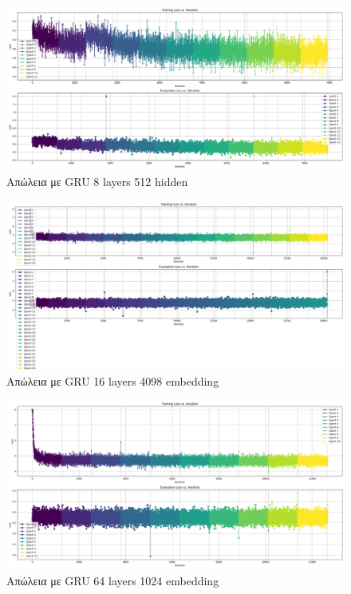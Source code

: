 \documentclass[conference]{IEEEtran}
\begin{document}
\begin{figure}[htbp]
    \centerline{\includegraphics[width=0.95\linewidth]{gru 8layers 512hidden.png}}
    \caption{Απώλεια με \textlatin{GRU 8 layers 512 hidden}}
\end{figure}

\begin{figure}[htbp]
    \centerline{\includegraphics[width=0.95\linewidth]{gru 16layers 4098 embed.png}}
    \caption{Απώλεια με \textlatin{GRU 16 layers 4098 embedding}}
\end{figure}

\begin{figure}[htbp]
    \centerline{\includegraphics[width=0.95\linewidth]{gru 64 layers 1024 emb.png}}
    \caption{Απώλεια με \textlatin{GRU 64 layers 1024 embedding}}
\end{figure}
\end{document}
